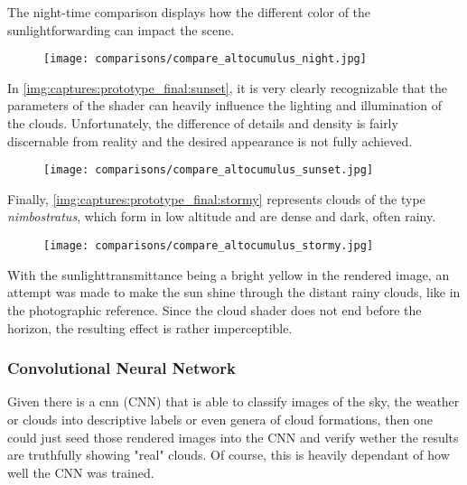 \noindent
The night-time comparison displays how the different color of the \gls{sunlightforwarding} can impact the scene.

\begin{figure}[H]
    \centering
    \texttt{[image: comparisons/compare\_altocumulus\_night.jpg]}
    \label{img:comparisons:altocumulus:night}
\end{figure}

\clearpage
\noindent
In \autoref{img:captures:prototype_final:sunset}, it is very clearly recognizable that the \gls{parameters} of the shader can heavily influence the lighting and illumination of the clouds.
Unfortunately, the difference of details and density is fairly discernable from reality and the desired appearance is not fully achieved.

\begin{figure}[H]
    \centering
    \texttt{[image: comparisons/compare\_altocumulus\_sunset.jpg]}
    \label{img:camparisons:altocumulus:sunset}
\end{figure}

\noindent
Finally, \autoref{img:captures:prototype_final:stormy} represents clouds of the type \textit{nimbostratus}, which form in low altitude and are dense and dark, often rainy.


\begin{figure}[H]
    \centering
    \texttt{[image: comparisons/compare\_altocumulus\_stormy.jpg]}
    \label{img:camparisons:altocumulus:stormy}
\end{figure}

\noindent
With the \gls{sunlighttransmittance} being a bright yellow in the rendered image, an attempt was made to make the sun shine through the distant rainy clouds, like in the photographic reference. Since the cloud shader does not end before the horizon, the resulting effect is rather imperceptible.

\subsubsection{Convolutional Neural Network}
Given there is a \gls{cnn} (CNN) that is able to classify images of the sky, the weather or clouds into descriptive labels or even genera of cloud formations, then one could just seed those rendered images into the CNN and verify wether the results are truthfully showing "real" clouds.
Of course, this is heavily dependant of how well the CNN was trained.

